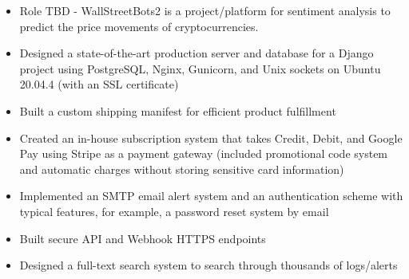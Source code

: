 \documentclass[10pt,a4paper,ragged2e]{altacv}
\begin{document}

\begin{fullwidth}
\makecvheader
\end{fullwidth}



\begin{itemize}
\item Role TBD - WallStreetBots2 is a project/platform for sentiment analysis to predict the price movements of cryptocurrencies.
\smallskip
\end{itemize}

\divider

\begin{itemize}
\item Designed a state-of-the-art production server and database for a
Django project using PostgreSQL, Nginx, Gunicorn, and Unix
sockets on Ubuntu 20.04.4 (with an SSL certificate)
\smallskip
\item Built a custom shipping manifest for efficient product fulfillment
\smallskip
\item Created an in-house subscription system that takes Credit, Debit,
and Google Pay using Stripe as a payment gateway (included
promotional code system and automatic charges without storing
sensitive card information)
\item Implemented an SMTP email alert system and an authentication scheme with typical features, for
example, a password reset system by email
\smallskip
\item Built secure API and Webhook HTTPS endpoints
\smallskip
\item Designed a full-text search system to search through thousands of logs/alerts
\smallskip
\end{itemize}
\end{document}
